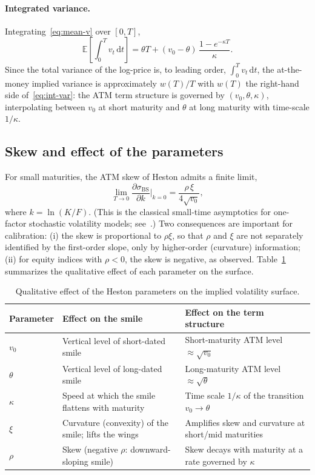 \documentclass[11pt,a4paper]{article}
\theoremstyle{plain}
\theoremstyle{definition}
\newcommand{\dd}{\mathrm{d}}
\newcommand{\E}{\mathbb{E}}
\begin{document}
\paragraph{Integrated variance.} Integrating~\eqref{eq:mean-v} over $[0,T]$,
\begin{equation}
    \E\!\left[\int_0^T v_t\,\dd t\right] = \theta T + (v_0-\theta)\,\frac{1-e^{-\kappa T}}{\kappa}.
    \label{eq:int-var}
\end{equation}
Since the total variance of the log-price is, to leading order, $\int_0^Tv_t\,\dd t$, the at-the-money implied variance is approximately $w(T)/T$ with $w(T)$ the right-hand side of~\eqref{eq:int-var}: the ATM term structure is governed by $(v_0,\theta,\kappa)$, interpolating between $v_0$ at short maturity and $\theta$ at long maturity with time-scale $1/\kappa$.

\subsection{Skew and effect of the parameters}
For small maturities, the ATM skew of Heston admits a finite limit,
\begin{equation}
    \lim_{T\to0}\frac{\partial\sigma_{\mathrm{BS}}}{\partial k}\bigg|_{k=0} = \frac{\rho\,\xi}{4\sqrt{v_0}},
    \label{eq:smallskew}
\end{equation}
where $k=\ln(K/F)$. (This is the classical small-time asymptotics for one-factor stochastic volatility models; see~\cite{gatheral}.) Two consequences are important for calibration: (i) the skew is proportional to $\rho\xi$, so that $\rho$ and $\xi$ are not separately identified by the first-order slope, only by higher-order (curvature) information; (ii) for equity indices with $\rho<0$, the skew is negative, as observed. Table~\ref{tab:params} summarizes the qualitative effect of each parameter on the surface.

\begin{table}[h]
\centering
\begin{tabular}{@{}p{1.8cm}p{5.2cm}p{7.0cm}@{}}
\toprule
Parameter & Effect on the smile & Effect on the term structure \\
\midrule
$v_0$ & Vertical level of short-dated smile & Short-maturity ATM level $\approx\sqrt{v_0}$ \\
$\theta$ & Vertical level of long-dated smile & Long-maturity ATM level $\approx\sqrt{\theta}$ \\
$\kappa$ & Speed at which the smile flattens with maturity & Time scale $1/\kappa$ of the transition $v_0\to\theta$ \\
$\xi$ & Curvature (convexity) of the smile; lifts the wings & Amplifies skew and curvature at short/mid maturities \\
$\rho$ & Skew (negative $\rho$: downward-sloping smile) & Skew decays with maturity at a rate governed by $\kappa$ \\
\bottomrule
\end{tabular}
\caption{Qualitative effect of the Heston parameters on the implied volatility surface.}
\label{tab:params}
\end{table}
\end{document}
